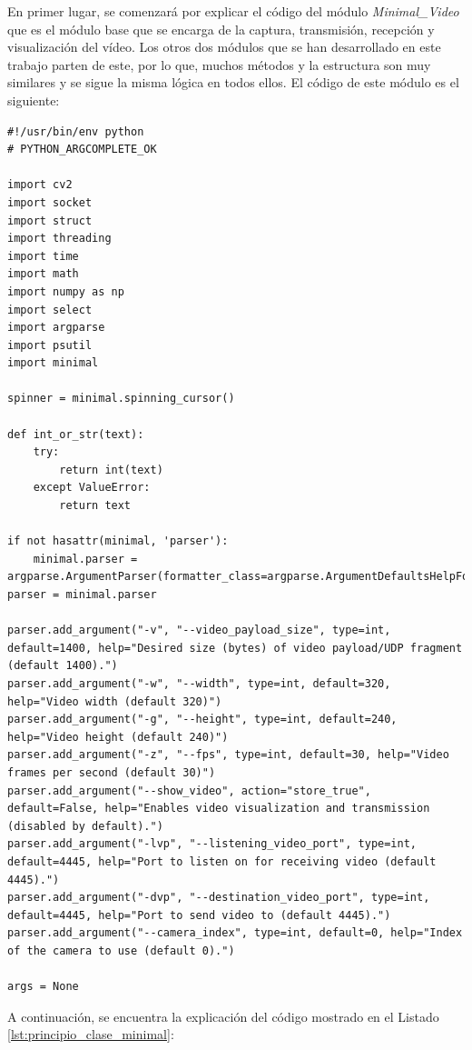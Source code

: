 En primer lugar, se comenzará por explicar el código del módulo \textit{Minimal\_Video} que es el módulo base que se encarga de la captura, transmisión, recepción y visualización del vídeo. Los otros dos módulos que se han desarrollado en este trabajo parten de este, por lo que, muchos métodos y la estructura son muy similares y se sigue la misma lógica en todos ellos. El código de este módulo es el siguiente:
\begin{lstlisting}[style=pythonstyle, caption={Comienzo del módulo \textit{Minimal\_Video} y sus parámetros.}, label={lst:principio_clase_minimal}]
#!/usr/bin/env python
# PYTHON_ARGCOMPLETE_OK

import cv2
import socket
import struct
import threading
import time
import math
import numpy as np
import select
import argparse
import psutil
import minimal

spinner = minimal.spinning_cursor()

def int_or_str(text):
    try:
        return int(text)
    except ValueError:
        return text

if not hasattr(minimal, 'parser'):
    minimal.parser = argparse.ArgumentParser(formatter_class=argparse.ArgumentDefaultsHelpFormatter)
parser = minimal.parser

parser.add_argument("-v", "--video_payload_size", type=int, default=1400, help="Desired size (bytes) of video payload/UDP fragment (default 1400).")
parser.add_argument("-w", "--width", type=int, default=320, help="Video width (default 320)")
parser.add_argument("-g", "--height", type=int, default=240, help="Video height (default 240)")
parser.add_argument("-z", "--fps", type=int, default=30, help="Video frames per second (default 30)")
parser.add_argument("--show_video", action="store_true", default=False, help="Enables video visualization and transmission (disabled by default).")
parser.add_argument("-lvp", "--listening_video_port", type=int, default=4445, help="Port to listen on for receiving video (default 4445).")
parser.add_argument("-dvp", "--destination_video_port", type=int, default=4445, help="Port to send video to (default 4445).")
parser.add_argument("--camera_index", type=int, default=0, help="Index of the camera to use (default 0).")

args = None
\end{lstlisting}

A continuación, se encuentra la explicación del código mostrado en el Listado \ref{lst:principio_clase_minimal}:

